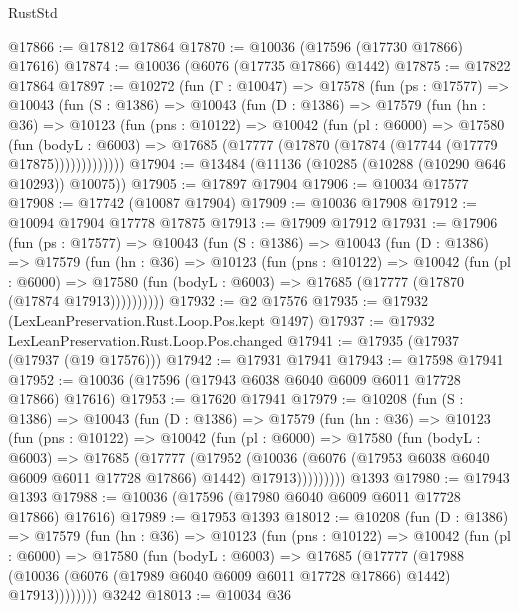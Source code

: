 \begin{lexlean}{RustStd}
\begin{coremodule}
{{@17866 := @17812 @17864
@17870 := @10036 (@17596 (@17730 @17866) @17616)
@17874 := @10036 (@6076 (@17735 @17866) @1442)
@17875 := @17822 @17864
@17897 := @10272
    (fun (Γ : @10047) =>
    @17578
      (fun (ps : @17577) =>
      @10043
        (fun (S : @1386) =>
        @10043
          (fun (D : @1386) =>
          @17579
            (fun (hn : @36) =>
            @10123
              (fun (pns : @10122) =>
              @10042
                (fun (pl : @6000) =>
                @17580
                  (fun (bodyL : @6003) =>
                  @17685 (@17777 (@17870 (@17874 (@17744 (@17779 @17875)))))))))))))
@17904 := @13484 (@11136 (@10285 (@10288 (@10290 @646 @10293)) @10075))
@17905 := @17897 @17904
@17906 := @10034 @17577
@17908 := @17742 (@10087 @17904)
@17909 := @10036 @17908
@17912 := @10094 @17904 @17778 @17875
@17913 := @17909 @17912
@17931 := @17906
    (fun (ps : @17577) =>
    @10043
      (fun (S : @1386) =>
      @10043
        (fun (D : @1386) =>
        @17579
          (fun (hn : @36) =>
          @10123
            (fun (pns : @10122) =>
            @10042
              (fun (pl : @6000) =>
              @17580 (fun (bodyL : @6003) => @17685 (@17777 (@17870 (@17874 @17913))))))))))
@17932 := @2 @17576
@17935 := @17932 (LexLeanPreservation.Rust.Loop.Pos.kept @1497)
@17937 := @17932 LexLeanPreservation.Rust.Loop.Pos.changed
@17941 := @17935 (@17937 (@17937 (@19 @17576)))
@17942 := @17931 @17941
@17943 := @17598 @17941
@17952 := @10036 (@17596 (@17943 @6038 @6040 @6009 @6011 @17728 @17866) @17616)
@17953 := @17620 @17941
@17979 := @10208
    (fun (S : @1386) =>
    @10043
      (fun (D : @1386) =>
      @17579
        (fun (hn : @36) =>
        @10123
          (fun (pns : @10122) =>
          @10042
            (fun (pl : @6000) =>
            @17580
              (fun (bodyL : @6003) =>
              @17685
                (@17777
                  (@17952
                    (@10036
                      (@6076 (@17953 @6038 @6040 @6009 @6011 @17728 @17866) @1442)
                      @17913)))))))))
    @1393
@17980 := @17943 @1393
@17988 := @10036 (@17596 (@17980 @6040 @6009 @6011 @17728 @17866) @17616)
@17989 := @17953 @1393
@18012 := @10208
    (fun (D : @1386) =>
    @17579
      (fun (hn : @36) =>
      @10123
        (fun (pns : @10122) =>
        @10042
          (fun (pl : @6000) =>
          @17580
            (fun (bodyL : @6003) =>
            @17685
              (@17777
                (@17988
                  (@10036 (@6076 (@17989 @6040 @6009 @6011 @17728 @17866) @1442) @17913))))))))
    @3242
@18013 := @10034 @36
}}
\end{coremodule}
\end{lexlean}

